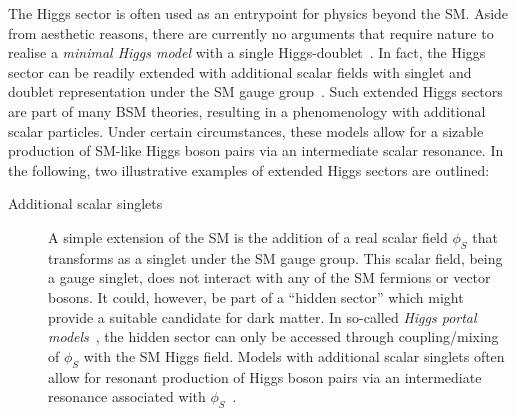 The Higgs sector is often used as an entrypoint for physics beyond the SM. Aside
from aesthetic reasons, there are currently no arguments that require nature to
realise a \emph{minimal Higgs model} with a single
Higgs-doublet~\cite{Gunion:1989we}. In fact, the Higgs sector can be readily
extended with additional scalar fields with singlet and doublet representation
under the SM gauge group~\cite{Gunion:1989we}. Such extended Higgs sectors are
part of many BSM theories, resulting in a phenomenology with additional scalar
particles. Under certain circumstances, these models allow for a sizable
production of SM-like Higgs boson pairs via an intermediate scalar resonance. In
the following, two illustrative examples of extended Higgs sectors are outlined:
\begin{description}

\item[Additional scalar singlets] A simple extension of the SM is the addition
  of a real scalar field $\phi_{S}$ that transforms as a singlet under the SM
  gauge group. This scalar field, being a gauge singlet, does not interact with
  any of the SM fermions or vector bosons. It could, however, be part of a
  ``hidden sector'' which might provide a suitable candidate for dark matter. In
  so-called \emph{Higgs portal models}~\cite{Patt:2006fw}, the hidden sector can
  only be accessed through coupling/mixing of $\phi_{S}$ with the SM Higgs
  field. Models with additional scalar singlets often allow for resonant
  production of Higgs boson pairs via an intermediate resonance associated with
  $\phi_{S}$~\cite{Schabinger:2005ei,Bowen:2007ia,Barger:2007im,Dolan:2012ac,No:2013wsa,Chen:2014ask,Robens:2016xkb,DiMicco:2019ngk}.


\end{description}
